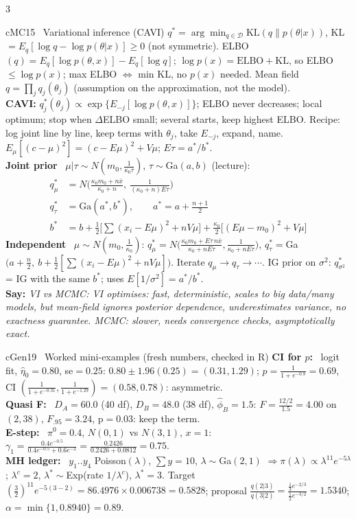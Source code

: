 \documentclass{article}
\newcommand{\h}[1]{{\bfseries #1}\ }
\newcommand{\say}[1]{{\color{cMC!75!black}\textbf{Say:}} \emph{#1}}
\begin{document}
\begin{multicols*}{3}
\begin{tb}{cMC}{15 \textbullet\ Variational inference (CAVI)}
$q^*=\arg\min_{q\in\mathcal D}\text{KL}(q\|p(\theta|x))$, KL$=E_q[\log q-\log p(\theta|x)]\ge0$ (not symmetric). ELBO$(q)=E_q[\log p(\theta,x)]-E_q[\log q]$; $\log p(x)=\text{ELBO}+\text{KL}$, so ELBO$\le\log p(x)$; max ELBO $\iff$ min KL, no $p(x)$ needed. Mean field $q=\prod_jq_j(\theta_j)$ (assumption on the approximation, not the model).\\
\textbf{CAVI:} $q_j^*(\theta_j)\propto\exp\{E_{-j}[\log p(\theta,x)]\}$; ELBO never decreases; local optimum; stop when $\Delta$ELBO small; several starts, keep highest ELBO. Recipe: log joint line by line, keep terms with $\theta_j$, take $E_{-j}$, expand, name. $E_\mu[(c-\mu)^2]=(c-E\mu)^2+V\mu$; $E\tau=a^*/b^*$.\\
\h{Joint prior} $\mu|\tau\sim N(m_0,\frac1{\kappa_0\tau})$, $\tau\sim$Ga$(a,b)$ (lecture):
\[\begin{aligned}q^*_\mu&=N\Big(\frac{\kappa_0m_0+n\bar x}{\kappa_0+n},\ \frac1{(\kappa_0+n)E\tau}\Big)\\
q^*_\tau&=\text{Ga}(a^*,b^*),\qquad a^*=a+\tfrac{n+1}2\\
b^*&=b+\tfrac12\big[\textstyle\sum(x_i-E\mu)^2+nV\mu\big]+\tfrac{\kappa_0}2\big[(E\mu-m_0)^2+V\mu\big]\end{aligned}\]
\h{Independent} $\mu\sim N(m_0,\frac1{\kappa_0})$: $q^*_\mu=N\big(\frac{\kappa_0m_0+E\tau\,n\bar x}{\kappa_0+nE\tau},\frac1{\kappa_0+nE\tau}\big)$, $q^*_\tau=$Ga$\big(a+\frac n2,\ b+\frac12[\sum(x_i-E\mu)^2+nV\mu]\big)$. Iterate $q_\mu\to q_\tau\to\cdots$.
IG prior on $\sigma^2$: $q^*_{\sigma^2}$ = IG with the same $b^*$; uses $E[1/\sigma^2]=a^*/b^*$.\\
\say{VI vs MCMC: VI optimises: fast, deterministic, scales to big data/many models, but mean-field ignores posterior dependence, underestimates variance, no exactness guarantee. MCMC: slower, needs convergence checks, asymptotically exact.}
\end{tb}

\begin{tb}{cGen}{19 \textbullet\ Worked mini-examples (fresh numbers, checked in R)}
\h{CI for $p$:} logit fit, $\hat\eta_0=0.80$, se$=0.25$: $0.80\pm1.96(0.25)=(0.31,1.29)$; $\hat p=\frac{1}{1+e^{-0.8}}=0.69$, CI $(\frac1{1+e^{-0.31}},\frac1{1+e^{-1.29}})=(0.58,0.78)$: asymmetric.\\
\h{Quasi F:} $D_A=60.0$ (40 df), $D_B=48.0$ (38 df), $\hat\phi_B=1.5$: $F=\frac{12/2}{1.5}=4.00$ on $(2,38)$, $F_{.95}=3.24$, p$=0.03$: keep the term.\\
\h{E-step:} $\pi^0=0.4$, $N(0,1)$ vs $N(3,1)$, $x=1$: $\gamma_1=\frac{0.4e^{-0.5}}{0.4e^{-0.5}+0.6e^{-2}}=\frac{0.2426}{0.2426+0.0812}=0.75$.\\
\h{MH ledger:} $y_1..y_4$ Poisson$(\lambda)$, $\sum y=10$, $\lambda\sim$Ga$(2,1)$ $\Rightarrow\pi(\lambda)\propto\lambda^{11}e^{-5\lambda}$; $\lambda^c=2$, $\lambda^*\sim$Exp(rate $1/\lambda^c$), $\lambda^*=3$.
Target $(\frac32)^{11}e^{-5(3-2)}=86.4976\times0.006738=0.5828$; proposal $\frac{q(2|3)}{q(3|2)}=\frac{\frac13e^{-2/3}}{\frac12e^{-3/2}}=1.5340$; $\alpha=\min\{1,0.8940\}=0.89$.
\end{tb}

\end{multicols*}
\end{document}
